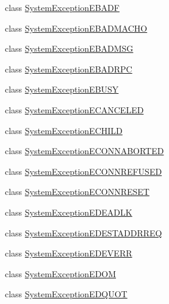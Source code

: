 \begin{DoxyCompactItemize}
class \hyperlink{class_communication_1_1_exception_1_1_system_exception_e_b_a_d_f}{System\+Exception\+E\+B\+A\+D\+F}
\item 
class \hyperlink{class_communication_1_1_exception_1_1_system_exception_e_b_a_d_m_a_c_h_o}{System\+Exception\+E\+B\+A\+D\+M\+A\+C\+H\+O}
\item 
class \hyperlink{class_communication_1_1_exception_1_1_system_exception_e_b_a_d_m_s_g}{System\+Exception\+E\+B\+A\+D\+M\+S\+G}
\item 
class \hyperlink{class_communication_1_1_exception_1_1_system_exception_e_b_a_d_r_p_c}{System\+Exception\+E\+B\+A\+D\+R\+P\+C}
\item 
class \hyperlink{class_communication_1_1_exception_1_1_system_exception_e_b_u_s_y}{System\+Exception\+E\+B\+U\+S\+Y}
\item 
class \hyperlink{class_communication_1_1_exception_1_1_system_exception_e_c_a_n_c_e_l_e_d}{System\+Exception\+E\+C\+A\+N\+C\+E\+L\+E\+D}
\item 
class \hyperlink{class_communication_1_1_exception_1_1_system_exception_e_c_h_i_l_d}{System\+Exception\+E\+C\+H\+I\+L\+D}
\item 
class \hyperlink{class_communication_1_1_exception_1_1_system_exception_e_c_o_n_n_a_b_o_r_t_e_d}{System\+Exception\+E\+C\+O\+N\+N\+A\+B\+O\+R\+T\+E\+D}
\item 
class \hyperlink{class_communication_1_1_exception_1_1_system_exception_e_c_o_n_n_r_e_f_u_s_e_d}{System\+Exception\+E\+C\+O\+N\+N\+R\+E\+F\+U\+S\+E\+D}
\item 
class \hyperlink{class_communication_1_1_exception_1_1_system_exception_e_c_o_n_n_r_e_s_e_t}{System\+Exception\+E\+C\+O\+N\+N\+R\+E\+S\+E\+T}
\item 
class \hyperlink{class_communication_1_1_exception_1_1_system_exception_e_d_e_a_d_l_k}{System\+Exception\+E\+D\+E\+A\+D\+L\+K}
\item 
class \hyperlink{class_communication_1_1_exception_1_1_system_exception_e_d_e_s_t_a_d_d_r_r_e_q}{System\+Exception\+E\+D\+E\+S\+T\+A\+D\+D\+R\+R\+E\+Q}
\item 
class \hyperlink{class_communication_1_1_exception_1_1_system_exception_e_d_e_v_e_r_r}{System\+Exception\+E\+D\+E\+V\+E\+R\+R}
\item 
class \hyperlink{class_communication_1_1_exception_1_1_system_exception_e_d_o_m}{System\+Exception\+E\+D\+O\+M}
\item 
class \hyperlink{class_communication_1_1_exception_1_1_system_exception_e_d_q_u_o_t}{System\+Exception\+E\+D\+Q\+U\+O\+T}

\end{DoxyCompactItemize}
